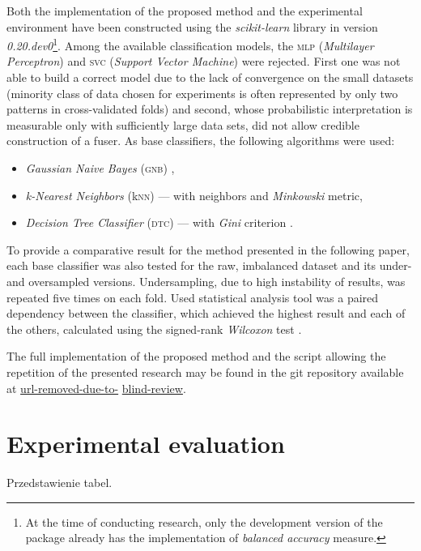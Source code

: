 \documentclass[pmlr]{jmlr}
\begin{document}
Both the implementation of the proposed method and the experimental environment have been constructed using the \emph{scikit-learn} library \citep{scikit-learn} in version \emph{0.20.dev0}\footnote{At the time of conducting research, only the development version of the package already has the implementation of \emph{balanced accuracy} measure.}. Among the available classification models, the \textsc{mlp} (\emph{Multilayer Perceptron}) and \textsc{svc} (\emph{Support Vector Machine}) were rejected. First one was not able to build a correct model due to the lack of convergence on the small datasets (minority class of data chosen for experiments is often represented by only two patterns in cross-validated folds) and second, whose probabilistic interpretation is measurable only with sufficiently large data sets, did not allow credible construction of a fuser. As base classifiers, the following algorithms were used:

\begin{itemize}
	\item \emph{Gaussian Naive Bayes} (\textsc{gnb}) \citep{gnb},
	\item \emph{k-Nearest Neighbors} (k\textsc{nn}) --- with  neighbors and \emph{Minkowski} metric,
	\item \emph{Decision Tree Classifier} (\textsc{dtc}) --- with \emph{Gini} criterion \citep{loh2011classification}.
\end{itemize}

To provide a comparative result for the method presented in the following paper, each base classifier was also tested for the raw, imbalanced dataset and its under- and oversampled versions. Undersampling, due to high instability of results, was repeated five times on each fold. Used statistical analysis tool was a paired dependency between the classifier, which achieved the highest result and each of the others, calculated using the signed-rank \emph{Wilcoxon} test \citep{wilcoxon1945individual}.

The full implementation of the proposed method and the script allowing the repetition of the presented research may be found in the git repository available at \url{url-removed-due-to-} \url{blind-review}.

\section{Experimental evaluation}
\label{sec:intro}

Przedstawienie tabel.
\end{document}
